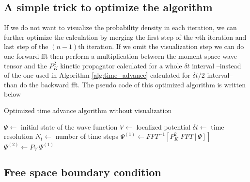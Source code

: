 \subsection{A simple trick to optimize the algorithm}

If we do not want to visualize the probability density in each iteration, we can further optimize the calculation by merging the first step of the $n$th iteration and last step of the $(n-1)$th iteration.
If we omit the visualization step we can do one forward \acrshort{fft} then perform a multiplication between the moment space wave tensor and the $P_K^2$ kinetic propagator calculated for a whole $\delta t$ interval --instead of the one used in Algorithm \ref{alg:time_advance} calculated for $\delta t / 2$ interval-- than do the backward \acrshort{fft}.
The pseudo code of this optimized algorithm is written below
\begin{algorithm}
	\caption{Optimized time advance algorithm without visualization}\label{alg:time_advance_optimized}
	\begin{algorithmic}
		\State $ \Psi \gets $ initial state of the wave function
		\State $ V \gets $ localized potential
		\State $ \delta t \gets $ time resolution
		\State $ N_t \gets $ number of time steps
		\For{$i \in [0, N_t)$}
		\State $\Psi^{(1)} \gets FFT^{-1}
		\left[
		P_K^2\; FFT\left[ \Psi \right]
		\right]
		$
		\State $\Psi^{(2)} \gets P_V\; \Psi^{(1)}$		
		\EndFor
	\end{algorithmic}
\end{algorithm}

\subsection{Free space boundary condition}

